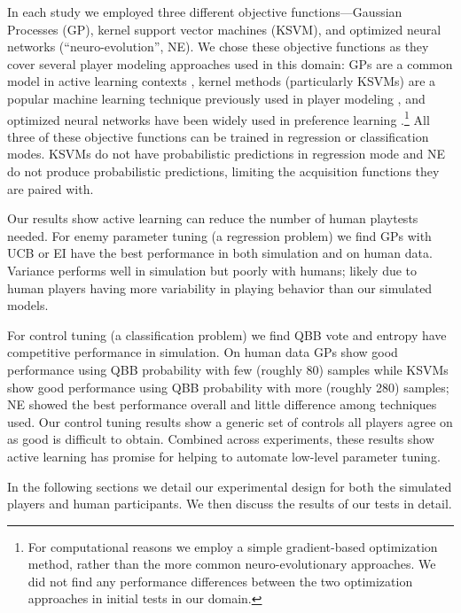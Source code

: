 \documentclass{sig-alternate}
\begin{document}
In each study we employed three different objective functions---Gaussian Processes (GP), kernel support vector machines (KSVM), and optimized neural networks (``neuro-evolution'', NE).
We chose these objective functions as they cover several player modeling approaches used in this domain: GPs are a common model in active learning contexts \cite{brochu2010:thesis}, kernel methods (particularly KSVMs) are a popular machine learning technique previously used in player modeling \cite{yu2011:minboredom}, and optimized neural networks have been widely used in preference learning \cite{yannakakis2011:edpcg}.\footnote{For computational reasons we employ a simple gradient-based optimization method, rather than the more common neuro-evolutionary approaches. We did not find any performance differences between the two optimization approaches in initial tests in our domain.}
All three of these objective functions can be trained in regression or classification modes.
KSVMs do not have probabilistic predictions in regression mode and NE do not produce probabilistic predictions, limiting the acquisition functions they are paired with.

Our results show active learning can reduce the number of human playtests needed.
For enemy parameter tuning (a regression problem) we find GPs with UCB or EI have the best performance in both simulation and on human data.
Variance performs well in simulation but poorly with humans; likely due to human players having more variability in playing behavior than our simulated models.

For control tuning (a classification problem) we find QBB vote and entropy have competitive performance in simulation.
On human data GPs show good performance using QBB probability with few (roughly 80) samples while KSVMs show good performance using QBB probability with more (roughly 280) samples; NE showed the best performance overall and little difference among techniques used.
Our control tuning results show a generic set of controls all players agree on as good is difficult to obtain.
Combined across experiments, these results show active learning has promise for helping to automate low-level parameter tuning.

In the following sections we detail our experimental design for both the simulated players and human participants.
We then discuss the results of our tests in detail.


%
\end{document}
